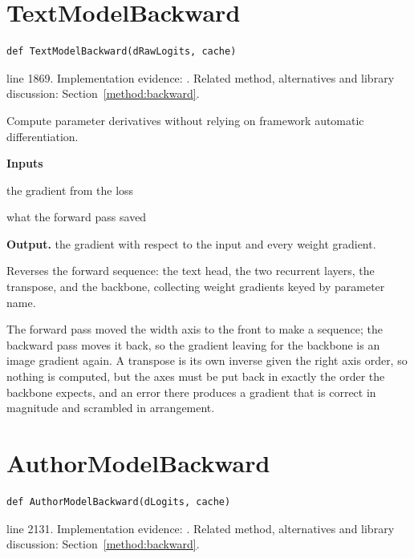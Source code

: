 \section{TextModelBackward}\label{fn:train:TextModelBackward}
\begin{lstlisting}[style=sig]
def TextModelBackward(dRawLogits, cache)
\end{lstlisting}
 line 1869. Implementation evidence: \cite{code2026}. Related method, alternatives and library discussion: Section~\ref{method:backward}.


Compute parameter derivatives without relying on framework automatic differentiation.




\noindent\textbf{Inputs}
\begin{description}[leftmargin=2.2em,style=nextline,font=\normalfont\ttfamily]\setlength\itemsep{1pt}
  \item[{dRawLogits}] \normalfont the gradient from the loss
  \item[{cache}] \normalfont what the forward pass saved
\end{description}

\noindent\textbf{Output.} the gradient with respect to the input and every weight gradient.


Reverses the forward sequence: the text head, the two recurrent layers, the transpose, and the backbone, collecting weight gradients keyed by parameter name.


The forward pass moved the width axis to the front to make a sequence; the backward pass moves it back, so the gradient leaving for the backbone is an image gradient again. A transpose is its own inverse given the right axis order, so nothing is computed, but the axes must be put back in exactly the order the backbone expects, and an error there produces a gradient that is correct in magnitude and scrambled in arrangement.



\section{AuthorModelBackward}\label{fn:train:AuthorModelBackward}
\begin{lstlisting}[style=sig]
def AuthorModelBackward(dLogits, cache)
\end{lstlisting}
 line 2131. Implementation evidence: \cite{code2026}. Related method, alternatives and library discussion: Section~\ref{method:backward}.



